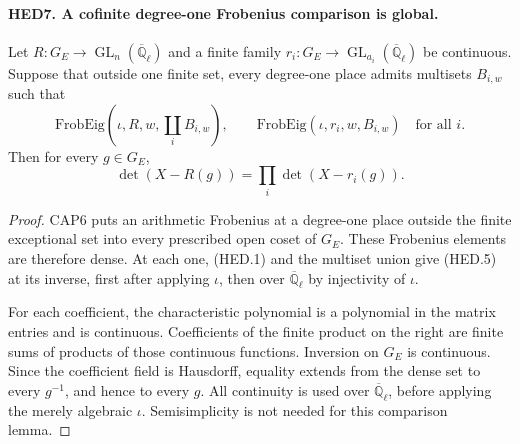 \paragraph{HED7. A cofinite degree-one Frobenius comparison is global.}
\label{claim:HED7}
Let \(R:G_E\to\operatorname{GL}_n(\overline{\mathbb Q}_\ell)\)
and a finite family \(r_i:G_E\to\operatorname{GL}_{a_i}
(\overline{\mathbb Q}_\ell)\) be continuous.  Suppose that outside
one finite set, every degree-one place admits multisets \(B_{i,w}\)
such that
\[
 \mathrm{FrobEig}(\iota,R,w,\coprod_i B_{i,w}),\qquad
              \mathrm{FrobEig}(\iota,r_i,w,B_{i,w})\quad\text{for all }i.
\]
Then for every \(g\in G_E\),
\[
                  \det(X-R(g))=\prod_i\det(X-r_i(g)).
 \tag{HED.5}
\]
\begin{proof}
CAP6 puts an arithmetic Frobenius at a degree-one place outside
the finite exceptional set into every prescribed open coset of
\(G_E\).  These Frobenius elements are therefore dense.  At each
one, (HED.1) and the multiset union give (HED.5) at its inverse,
first after applying \(\iota\), then over
\(\overline{\mathbb Q}_\ell\) by injectivity of \(\iota\).

For each coefficient, the characteristic polynomial is a polynomial
in the matrix entries and is continuous.  Coefficients of the finite
product on the right are finite sums of products of those continuous
functions.  Inversion on \(G_E\) is continuous.  Since the coefficient
field is Hausdorff, equality extends from the dense set to every
\(g^{-1}\), and hence to every \(g\).  All continuity is used over
\(\overline{\mathbb Q}_\ell\), before applying the merely algebraic
\(\iota\).  Semisimplicity is not needed for this comparison lemma.
\end{proof}

